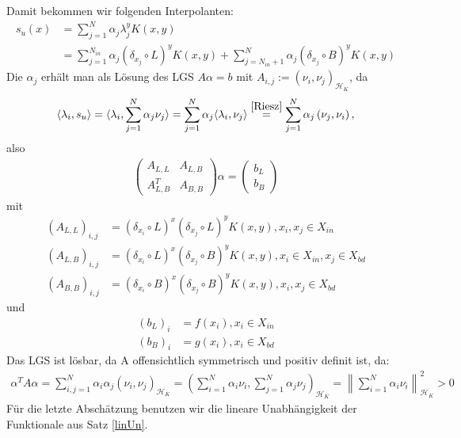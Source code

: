 Damit bekommen wir folgenden Interpolanten:
\begin{align*}
s_u(x) &= \sum_{j=1}^N \alpha_j \lambda_j^y K(x,y)\\
&= \sum_{j=1}^{N_{in}} \alpha_j (\delta_{x_j} \circ L)^y K(x,y) + \sum_{j=N_{in}+1}^{N} \alpha_j (\delta_{x_j} \circ B)^y K(x,y)
\end{align*}
Die $\alpha_j$ erhält man als Lösung des \ac{LGS} $A \alpha = b$ mit $A_{i,j} := (\nu_i,\nu_j)_{\mathcal{H}_K}$, da
\begin{align*}
\langle \lambda_i, s_u\rangle = \langle \lambda_i, \sum_{j=1}^N \alpha_j \nu_j \rangle = \sum_{j=1}^N \alpha_j \langle \lambda_i,\nu_j\rangle \overset{\ref{Riesz}}{=} \sum_{j=1}^N \alpha_j \left(\nu_j, \nu_i\right),
\end{align*}
also
\begin{align*}
\begin{pmatrix}
A_{L,L} & A_{L,B} \\ 
A_{L,B}^T & A_{B,B}
\end{pmatrix} 
\alpha =
\begin{pmatrix}
b_L \\ 
b_B
\end{pmatrix} 
\end{align*}
mit
\begin{align*}
(A_{L,L})_{i,j} &= (\delta_{x_i} \circ L)^x(\delta_{x_j} \circ L)^y K(x,y),x_i, x_j \in X_{in}\\
(A_{L,B})_{i,j} &= (\delta_{x_i} \circ L)^x(\delta_{x_j} \circ B)^y K(x,y),x_i \in X_{in}, x_j \in X_{bd} \\
(A_{B,B})_{i,j} &= (\delta_{x_i} \circ B)^x(\delta_{x_j} \circ B)^y K(x,y), x_i, x_j \in X_{bd}
\end{align*}
und
\begin{align*}
(b_L)_i &= f(x_i), x_i \in X_{in}\\
(b_B)_i &= g(x_i), x_i \in X_{bd}
\end{align*}
Das \ac{LGS} ist lösbar, da A offensichtlich symmetrisch und positiv definit ist, da:
\begin{align*}
\alpha^T A \alpha = \sum_{i,j = 1}^N \alpha_i \alpha_j (\nu_i, \nu_j)_{\mathcal{H}_K} = \left(\sum_{i=1}^N \alpha_i \nu_i, \sum_{j=1}^N \alpha_j \nu_j \right)_{\mathcal{H}_K} = \left\| \sum_{i=1}^N \alpha_i \nu_i \right\|_{\mathcal{H}_K}^2 > 0
\end{align*}
Für die letzte Abschätzung benutzen wir die lineare Unabhängigkeit der Funktionale aus Satz \ref{linUn}.
